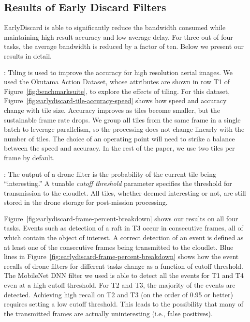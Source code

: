 \subsection{Results of Early Discard Filters}
\label{sec:earlydiscard-result}

EarlyDiscard is able to significantly reduce the bandwidth consumed while
maintaining high result accuracy and low average delay. For three out of four
tasks, the average bandwidth is reduced by a factor of ten. Below we present
our results in detail.

: Tiling is used to improve the accuracy
for high resolution aerial images. We used the Okutama Action Dataset, whose
attributes are shown in row T1 of Figure~\ref{fig:benchmarksuite}, to explore
the effects of tiling.  For this dataset,
Figure~\ref{fig:earlydiscard-tile-accuracy-speed} shows how speed and accuracy
change with tile size.  Accuracy improves as tiles become smaller, but the
sustainable frame rate drops.  We group all tiles from the same frame in a
single batch to leverage parallelism, so the processing does not change linearly
with the number of tiles. The choice of an operating point will need to strike a
balance between the speed and accuracy.  In the rest of the paper, we use two
tiles per frame by default. 

: The output of a drone filter is the
probability of the current tile being ``interesting.''  A tunable {\em cutoff
threshold} parameter specifies the threshold for transmission to the cloudlet.
All tiles, whether deemed interesting or not, are still stored in the drone
storage for post-mission processing.

Figure~\ref{fig:earlydiscard-frame-percent-breakdown} shows our results on all
four tasks. Events such as detection of a raft in T3 occur in consecutive
frames, all of which contain the object of interest. A correct detection of an
event is defined as at least one of the consecutive frames being transmitted to
the cloudlet.  Blue lines in
Figure~\ref{fig:earlydiscard-frame-percent-breakdown} shows how the event
recalls of drone filters for different tasks change as a function of cutoff
threshold. The MobileNet DNN filter we used is able to detect all the events for
T1 and T4 even at a high cutoff threshold. For T2 and T3, the majority of the
events are detected. Achieving high recall on T2 and T3 (on the order of 0.95 or
better) requires setting a low cutoff threshold.  This leads to the possibility
that many of the transmitted frames are actually uninteresting (i.e., false
positives).

